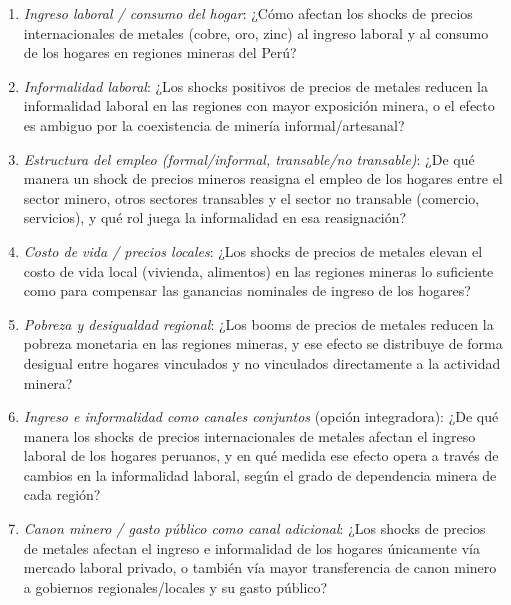 \documentclass[11pt]{article}
\begin{document}
\begin{enumerate}[label=\textbf{V\arabic*.}]
  \item \textit{Ingreso laboral / consumo del hogar}: ¿Cómo afectan los shocks de precios internacionales de metales (cobre, oro, zinc) al ingreso laboral y al consumo de los hogares en regiones mineras del Perú?

  \item \textit{Informalidad laboral}: ¿Los shocks positivos de precios de metales reducen la informalidad laboral en las regiones con mayor exposición minera, o el efecto es ambiguo por la coexistencia de minería informal/artesanal?

  \item \textit{Estructura del empleo (formal/informal, transable/no transable)}: ¿De qué manera un shock de precios mineros reasigna el empleo de los hogares entre el sector minero, otros sectores transables y el sector no transable (comercio, servicios), y qué rol juega la informalidad en esa reasignación?

  \item \textit{Costo de vida / precios locales}: ¿Los shocks de precios de metales elevan el costo de vida local (vivienda, alimentos) en las regiones mineras lo suficiente como para compensar las ganancias nominales de ingreso de los hogares?

  \item \textit{Pobreza y desigualdad regional}: ¿Los booms de precios de metales reducen la pobreza monetaria en las regiones mineras, y ese efecto se distribuye de forma desigual entre hogares vinculados y no vinculados directamente a la actividad minera?

  \item \textit{Ingreso e informalidad como canales conjuntos} (opción integradora): ¿De qué manera los shocks de precios internacionales de metales afectan el ingreso laboral de los hogares peruanos, y en qué medida ese efecto opera a través de cambios en la informalidad laboral, según el grado de dependencia minera de cada región?

  \item \textit{Canon minero / gasto público como canal adicional}: ¿Los shocks de precios de metales afectan el ingreso e informalidad de los hogares únicamente vía mercado laboral privado, o también vía mayor transferencia de canon minero a gobiernos regionales/locales y su gasto público?
\end{enumerate}
\end{document}
